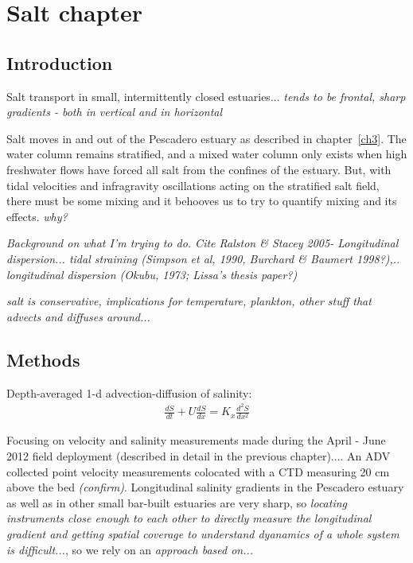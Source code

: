 \chapter{Salt chapter}
\label{chSalt}


\section{Introduction}
Salt transport in small, intermittently closed estuaries... \emph{tends to be frontal, sharp gradients - both in vertical and in horizontal}

Salt moves in and out of the Pescadero estuary as described in chapter~\ref{ch3}. The water column remains stratified, and a mixed water column only exists when high freshwater flows have forced all salt from the confines of the estuary. But, with tidal velocities and infragravity oscillations acting on the stratified salt field, there must be some mixing and it behooves us to try to quantify mixing and its effects. \emph{why?}



\emph{Background on what I'm trying to do.  Cite Ralston \& Stacey 2005- Longitudinal dispersion... tidal straining (Simpson et al, 1990, Burchard \& Baumert 1998?),.. longitudinal dispersion (Okubu, 1973; Lissa's thesis paper?)}

\emph{salt is conservative, implications for temperature, plankton, other stuff that advects and diffuses around...}



\section{Methods}

Depth-averaged 1-d advection-diffusion of salinity:
\begin{eqnarray}
\frac{dS}{dt} + U\frac{dS}{dx} = K_x\frac{d^2S}{dx^2} \label{eq:1dadvdiff}
\end{eqnarray}


Focusing on velocity and salinity measurements made during the April - June 2012 field deployment (described in detail in the previous chapter).... An ADV collected point velocity measurements colocated with a CTD measuring 20 cm above the bed \emph{(confirm)}. Longitudinal salinity gradients in the Pescadero estuary as well as in other small bar-built estuaries are very sharp, so \emph{locating instruments close enough to each other to directly measure the longitudinal gradient and getting spatial coverage to understand dyanamics of a whole system is difficult...}, so we rely on an \emph{approach based on...}


